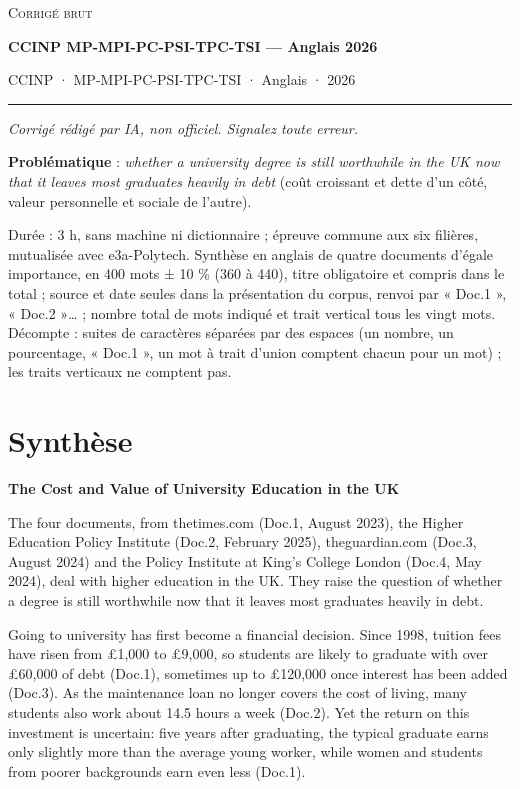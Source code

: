 \documentclass[11pt,a4paper]{article}
\begin{document}
\thispagestyle{plain}
\begin{center}
  {\small\scshape Corrigé brut}\par\smallskip
  {\LARGE\bfseries CCINP MP-MPI-PC-PSI-TPC-TSI — Anglais 2026\par}\medskip
  {\large CCINP · MP-MPI-PC-PSI-TPC-TSI · Anglais · 2026\par}
\end{center}
\vspace{2pt}\hrule\vspace{8pt}

\emph{Corrigé rédigé par IA, non officiel. Signalez toute erreur.}

\textbf{Problématique} : \emph{whether a university degree is still worthwhile in the UK now that it leaves most graduates heavily in debt} (coût croissant et dette d'un côté, valeur personnelle et sociale de l'autre).

Durée : 3 h, sans machine ni dictionnaire ; épreuve commune aux six filières, mutualisée avec e3a-Polytech. Synthèse en anglais de quatre documents d'égale importance, en 400 mots ± 10 \% (360 à 440), titre obligatoire et compris dans le total ; source et date seules dans la présentation du corpus, renvoi par « Doc.1 », « Doc.2 »\ldots{} ; nombre total de mots indiqué et trait vertical tous les vingt mots. Décompte : suites de caractères séparées par des espaces (un nombre, un pourcentage, « Doc.1 », un mot à trait d'union comptent chacun pour un mot) ; les traits verticaux ne comptent pas.

\hypertarget{synthuxe8se}{%
\section{Synthèse}\label{synthuxe8se}}

\textbf{The Cost and Value of University Education in the UK}

The four documents, from thetimes.com (Doc.1, August 2023), the Higher \textbar{} Education Policy Institute (Doc.2, February 2025), theguardian.com (Doc.3, August 2024) and the Policy Institute at King's College London (Doc.4, May \textbar{} 2024), deal with higher education in the UK. They raise the question of whether a degree is still worthwhile now \textbar{} that it leaves most graduates heavily in debt.

Going to university has first become a financial decision. Since 1998, tuition \textbar{} fees have risen from £1,000 to £9,000, so students are likely to graduate with over £60,000 of debt (Doc.1), sometimes \textbar{} up to £120,000 once interest has been added (Doc.3). As the maintenance loan no longer covers the cost of living, \textbar{} many students also work about 14.5 hours a week (Doc.2). Yet the return on this investment is uncertain: five years \textbar{} after graduating, the typical graduate earns only slightly more than the average young worker, while women and students from poorer \textbar{} backgrounds earn even less (Doc.1).
\end{document}
